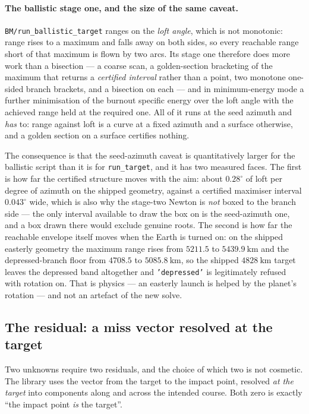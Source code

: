 \documentclass[11pt]{article}
\newcommand{\code}[1]{\texttt{#1}}
\begin{document}
\paragraph{The ballistic stage one, and the size of the same caveat.}
\code{BM/run\_ballistic\_target} ranges on the \emph{loft angle}, which is not
monotonic: range rises to a maximum and falls away on both sides, so every
reachable range short of that maximum is flown by two arcs. Its stage one
therefore does more work than a bisection --- a coarse scan, a golden-section
bracketing of the maximum that returns a \emph{certified interval} rather than
a point, two monotone one-sided branch brackets, and a bisection on each ---
and in minimum-energy mode a further minimisation of the burnout specific
energy over the loft angle with the achieved range held at the required one.
All of it runs at the seed azimuth and \emph{has} to: range against loft is a
curve at a fixed azimuth and a surface otherwise, and a golden section on a
surface certifies nothing.

The consequence is that the seed-azimuth caveat is quantitatively larger for
the ballistic script than it is for \code{run\_target}, and it has two measured
faces. The first is how
far the certified structure moves with the aim: about $0.28^{\circ}$ of loft
per degree of azimuth on the shipped geometry, against a certified maximiser
interval $0.043^{\circ}$ wide, which is also why the stage-two Newton is
\emph{not} boxed to the branch side --- the only interval available to draw the
box on is the seed-azimuth one, and a box drawn there would exclude genuine
roots. The second is how far the reachable envelope itself moves when the Earth
is turned on: on the shipped easterly geometry the maximum range rises from
$5211.5$ to $5439.9~\mathrm{km}$ and the depressed-branch floor from $4708.5$
to $5085.8~\mathrm{km}$, so the shipped $4828~\mathrm{km}$ target leaves the
depressed band altogether and \code{'depressed'} is legitimately refused with
rotation on. That is physics --- an easterly launch is helped by the planet's
rotation --- and not an artefact of the new solve.

\subsection{The residual: a miss vector resolved at the target}
\label{sec:missvector}

Two unknowns require two residuals, and the choice of which two is not
cosmetic. The library uses the vector from the target to the impact point,
resolved \emph{at the target} into components along and across the intended
course. Both zero is exactly ``the impact point \emph{is} the target''.
\end{document}
